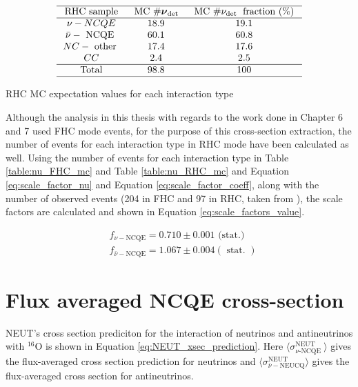 \begin{table}
    $$
    \begin{array}{ccc}
    \hline \text { RHC sample } & \text { MC } \# \boldsymbol{\nu}_{\text {det }} & \text { MC } \# \nu_{\text {det }} \text { fraction (\%) } \\
    \hline \nu-N C Q E & 18.9 & 19.1 \\
    \bar{\nu}-\text { NCQE } & 60.1 & 60.8 \\
    N C-\text { other } & 17.4 & 17.6 \\
    C C & 2.4 & 2.5 \\
    \hline \text { Total } & 98.8 & 100 \\
    \hline
    \end{array}
    $$
    \caption{RHC MC expectation values for each interaction type}
    \label{table:nu_RHC_mc}
\end{table}

Although the analysis in this thesis with regards to the work done in Chapter 6 and 7 used FHC mode events, for the purpose of this cross-section extraction, the number of events for each interaction type in RHC mode have been calculated as well. Using the number of events for each interaction type in Table \ref{table:nu_FHC_mc} and Table \ref{table:nu_RHC_mc} and Equation \ref{eq:scale_factor_nu} and Equation \ref{eq:scale_factor_coeff}, along with the number of observed events (204 in FHC and 97 in RHC, taken from \cite{Abe_2019}), the scale factors are calculated and shown in Equation \ref{eq:scale_factors_value}.

\begin{equation}
    \begin{aligned}
    & f_{\nu-\mathrm{NCQE}}=0.710 \pm 0.001 \text { (stat.) } \\
    & f_{\bar{\nu}-\mathrm{NCQE}}=1.067 \pm 0.004 (\text { stat. })
    \end{aligned}
\label{eq:scale_factors_value}
\end{equation}
    


\section{Flux averaged NCQE cross-section}

NEUT's cross section prediciton for the interaction of neutrinos and antineutrinos with ${ }^{16} \mathrm{O}$ is shown in Equation \ref{eq:NEUT_xsec_prediction}. Here $\langle\sigma_{\nu \text {-NCQE }}^{\text {NEUT }}\rangle$ gives the flux-averaged cross section prediction for neutrinos and $\langle\sigma_{\bar{\nu}-\mathrm{NEUCQ}}^{\mathrm{NEUT}}\rangle$ gives the flux-averaged cross section for antineutrinos. 


